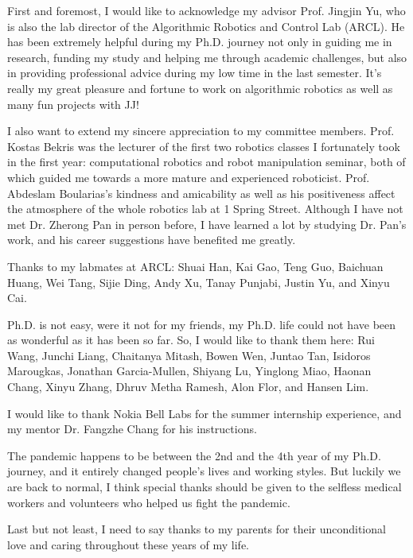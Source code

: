 
\begin{acknowledgments}
First and foremost, I would like to acknowledge my advisor Prof. Jingjin Yu, 
who is also the lab director of the Algorithmic Robotics and Control Lab (ARCL). 
He has been extremely helpful during my Ph.D. journey 
not only in guiding me in research, funding my study and helping me through academic challenges, 
but also in providing professional advice during my low time in the last semester. 
It's really my great pleasure and fortune to work on algorithmic robotics 
as well as many fun projects with JJ! 

I also want to extend my sincere appreciation to my committee members. 
Prof. Kostas Bekris was the lecturer of the first two robotics classes I fortunately took in the first year: 
computational robotics and robot manipulation seminar, both of which guided me 
towards a more mature and experienced roboticist. 
Prof. Abdeslam Boularias's kindness and amicability as well as his positiveness affect
the atmosphere of the whole robotics lab at 1 Spring Street.
Although I have not met Dr. Zherong Pan in person before, 
I have learned a lot by studying Dr. Pan's work, 
and his career suggestions have benefited me greatly.

Thanks to my labmates at ARCL: Shuai Han, 
Kai Gao, Teng Guo, Baichuan Huang, Wei Tang, Sijie Ding, Andy Xu, Tanay Punjabi, 
Justin Yu, and Xinyu Cai. 

Ph.D. is not easy, were it not for my friends, my Ph.D. life 
could not have been as wonderful as it has been so far. 
So, I would like to thank them here: Rui Wang, Junchi Liang, Chaitanya Mitash, Bowen Wen, Juntao Tan, 
Isidoros Marougkas, Jonathan Garcia-Mullen, Shiyang Lu, Yinglong Miao, Haonan Chang, Xinyu Zhang, 
Dhruv Metha Ramesh, Alon Flor, and Hansen Lim. 

I would like to thank Nokia Bell Labs for the summer internship experience,
and my mentor Dr. Fangzhe Chang for his instructions.

The pandemic happens to be between the 2nd and the 4th year of my Ph.D. journey, 
and it entirely changed people's lives and working styles. 
But luckily we are back to normal, I think special thanks should be given to the 
selfless medical workers and volunteers who helped us fight the pandemic. 

Last but not least, I need to say thanks to my parents for their unconditional love 
and caring throughout these years of my life. 

\end{acknowledgments}
